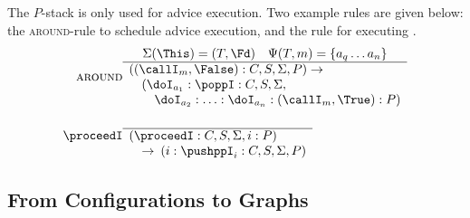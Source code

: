 The $P$-stack is only used for advice execution. Two example rules are given
below: the \textsc{around}-rule to schedule advice execution, and the rule for
executing \proceedI.
\begin{eqnarray*}
\textsc{around} &  \begin{array}{@{}c@{}}
\Sigma(\This)=(T,\Fd)\quad \Psi(T,m) = \{a_q\dotsc a_n\} \\
\hline
\begin{array}{l}
((\callI_m,\False):C,S, \Sigma,P) \rightarrow \\
\quad (\doI_{a_1}:\poppI:C, S, \Sigma, \\
\qquad \doI_{a_2}:\dotsc:\doI_{a_n}: (\callI_m,\True):P)
\end{array}
\end{array}
\\
\proceedI &  \begin{array}{@{}c@{}}
\: \\
\hline
\begin{array}{l}
(\proceedI:C, S ,\Sigma, i:P) \\
\quad \rightarrow \: (i:\pushppI_i:C, S, \Sigma, P)
\end{array}
\end{array}
\end{eqnarray*}

\subsection{From Configurations to Graphs}

